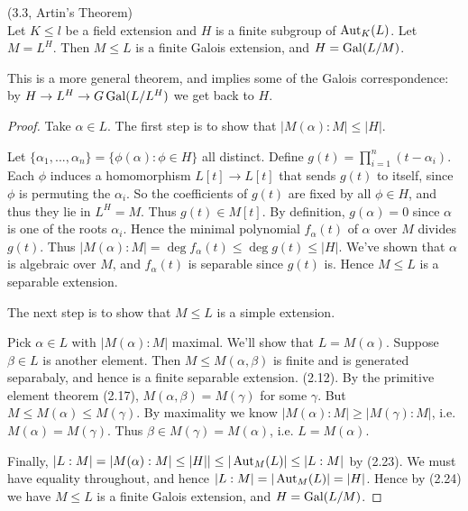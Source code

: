 \documentclass[a4paper]{article}
\begin{document}
\begin{thm} (3.3, Artin's Theorem)\\
Let $K \leq l$ be a field extension and $H$ is a finite subgroup of $\operatorname{Aut}_K(L)$. Let $M = L^H$. Then $M \leq L$ is a finite Galois extension, and $H = \operatorname{Gal}(L/M)$.

This is a more general theorem, and implies some of the Galois correspondence: by $H \to L^H \to G\operatorname{Gal}(L/L^H)$ we get back to $H$.
\begin{proof}
Take $\alpha \in L$. The first step is to show that $|M(\alpha) :M | \leq |H|$.

Let $\{\alpha_1,...,\alpha_n\} = \{\phi(\alpha):\phi \in H\}$ all distinct. Define $g(t) = \prod_{i=1}^n (t-\alpha_i)$. Each $\phi$ induces a homomorphism $L[t] \to L[t]$ that sends $g(t)$ to itself, since $\phi$ is permuting the $\alpha_i$. So the coefficients of $g(t)$ are fixed by all $\phi \in H$, and thus they lie in $L^H = M$. Thus $g(t) \in M[t]$. By definition, $g(\alpha)=0$ since $\alpha$ is one of the roots $\alpha_i$. Hence the minimal polynomial $f_\alpha(t)$ of $\alpha$ over $M$ divides $g(t)$. Thus $|M(\alpha):M| = \deg f_\alpha(t) \leq \deg g(t) \leq |H|$. We've shown that $\alpha$ is algebraic over $M$, and $f_\alpha(t)$ is separable since $g(t)$ is. Hence $M \leq L$ is a separable extension.

The next step is to show that $M\leq L$ is a simple extension.

Pick $\alpha \in L$ with $|M(\alpha):M|$ maximal. We'll show that $L = M(\alpha)$. Suppose $\beta \in L$ is another element. Then $M \leq M(\alpha,\beta)$ is finite and is generated separabaly, and hence is a finite separable extension. (2.12). By the primitive element theorem (2.17), $M(\alpha,\beta) = M(\gamma)$ for some $\gamma$. But $M \leq M(\alpha) \leq M(\gamma)$. By maximality we know $|M(\alpha):M| \geq |M(\gamma):M|$, i.e. $M(\alpha) = M(\gamma)$. Thus $\beta \in M(\gamma) = M(\alpha)$, i.e. $L = M(\alpha)$. 

Finally, $|L:M| = |M(\alpha):M| \leq |H|| \leq |\operatorname{Aut}_M(L)| \leq |L:M|$ by (2.23). We must have equality throughout, and hence $|L:M| = |\operatorname{Aut}_M(L)| = |H|$. Hence by (2.24) we have $M \leq L$ is a finite Galois extension, and $H = \operatorname{Gal}(L/M)$.
\end{proof}
\end{thm}
\end{document}
